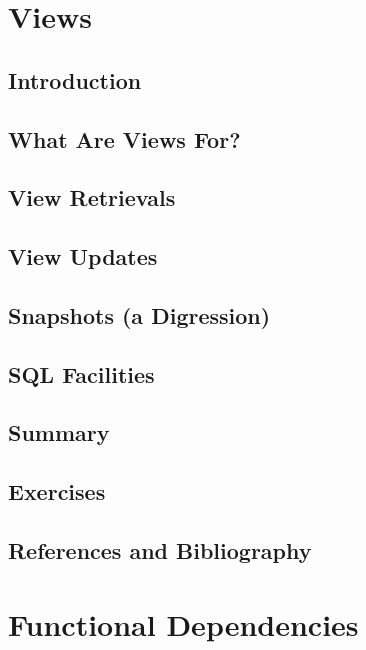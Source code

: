 \documentclass{book}
\begin{document}
\chapter{Views}

\section{Introduction}

\section{What Are Views For?}

\section{View Retrievals}

\section{View Updates}

\section{Snapshots (a Digression)}

\section{SQL Facilities}

\section{Summary}

\section{Exercises}

\section{References and Bibliography}












\chapter{Functional Dependencies}
\end{document}
